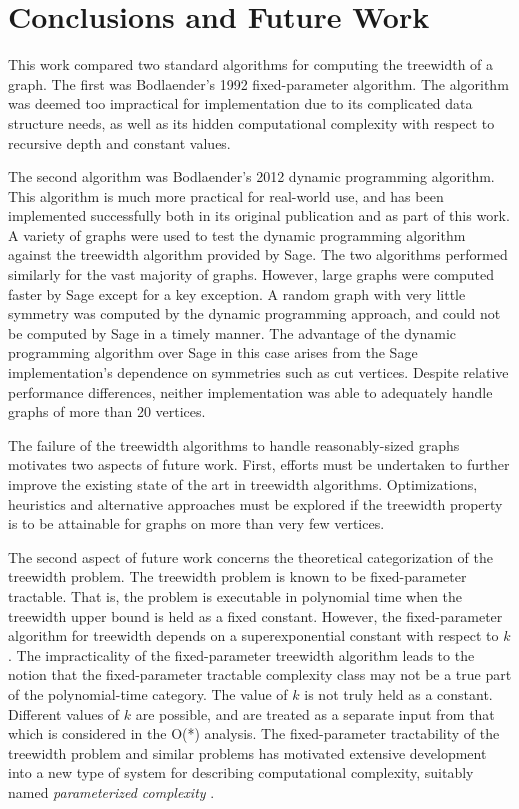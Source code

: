\documentclass[12pt,conference]{IEEEtran}
\theoremstyle{plain}
\begin{document}
\section{Conclusions and Future Work}

This work compared two standard algorithms for computing the treewidth of a graph. The first was Bodlaender's 1992 fixed-parameter algorithm. The algorithm was deemed too impractical for implementation due to its complicated data structure needs, as well as its hidden computational complexity with respect to recursive depth and constant values. 

The second algorithm was Bodlaender's 2012 dynamic programming algorithm. This algorithm is much more practical for real-world use, and has been implemented successfully both in its original publication and as part of this work. A variety of graphs were used to test the dynamic programming algorithm against the treewidth algorithm provided by Sage. The two algorithms performed similarly for the vast majority of graphs. However, large graphs were computed faster by Sage except for a key exception. A random graph with very little symmetry was computed by the dynamic programming approach, and could not be computed by Sage in a timely manner. The advantage of the dynamic programming algorithm over Sage in this case arises from the Sage implementation's dependence on symmetries such as cut vertices. Despite relative performance differences, neither implementation was able to adequately handle graphs of more than 20 vertices. 

The failure of the treewidth algorithms to handle reasonably-sized graphs motivates two aspects of future work. First, efforts must be undertaken to further improve the existing state of the art in treewidth algorithms. Optimizations, heuristics and alternative approaches must be explored if the treewidth property is to be attainable for graphs on more than very few vertices.

The second aspect of future work concerns the theoretical categorization of the treewidth problem. The treewidth problem is known to be fixed-parameter tractable. That is, the problem is executable in polynomial time when the treewidth upper bound is held as a fixed constant. However, the fixed-parameter algorithm for treewidth depends on a superexponential constant with respect to $k$. The impracticality of the fixed-parameter treewidth algorithm leads to the notion that the fixed-parameter tractable complexity class may not be a true part of the polynomial-time category. The value of $k$ is not truly held as a constant. Different values of $k$ are possible, and are treated as a separate input from that which is considered in the O(*) analysis. The fixed-parameter tractability of the treewidth problem and similar problems has motivated extensive development into a new type of system for describing computational complexity, suitably named \textit{parameterized complexity} \cite{downey-fellows}. 
\end{document}
